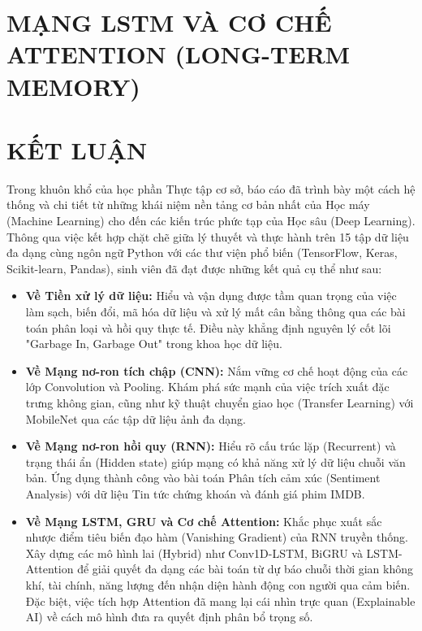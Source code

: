 \documentclass[12pt, a4paper]{article}
\begin{document}
\section{MẠNG LSTM VÀ CƠ CHẾ ATTENTION (LONG-TERM MEMORY)}

\newpage

\section*{KẾT LUẬN}
Trong khuôn khổ của học phần Thực tập cơ sở, báo cáo đã trình bày một cách hệ thống và chi tiết từ những khái niệm nền tảng cơ bản nhất của Học máy (Machine Learning) cho đến các kiến trúc phức tạp của Học sâu (Deep Learning). Thông qua việc kết hợp chặt chẽ giữa lý thuyết và thực hành trên 15 tập dữ liệu đa dạng cùng ngôn ngữ Python với các thư viện phổ biến (TensorFlow, Keras, Scikit-learn, Pandas), sinh viên đã đạt được những kết quả cụ thể như sau:

\begin{itemize}
    \item \textbf{Về Tiền xử lý dữ liệu:} Hiểu và vận dụng được tầm quan trọng của việc làm sạch, biến đổi, mã hóa dữ liệu và xử lý mất cân bằng thông qua các bài toán phân loại và hồi quy thực tế. Điều này khẳng định nguyên lý cốt lõi "Garbage In, Garbage Out" trong khoa học dữ liệu.
    \item \textbf{Về Mạng nơ-ron tích chập (CNN):} Nắm vững cơ chế hoạt động của các lớp Convolution và Pooling. Khám phá sức mạnh của việc trích xuất đặc trưng không gian, cũng như kỹ thuật chuyển giao học (Transfer Learning) với MobileNet qua các tập dữ liệu ảnh đa dạng.
    \item \textbf{Về Mạng nơ-ron hồi quy (RNN):} Hiểu rõ cấu trúc lặp (Recurrent) và trạng thái ẩn (Hidden state) giúp mạng có khả năng xử lý dữ liệu chuỗi văn bản. Ứng dụng thành công vào bài toán Phân tích cảm xúc (Sentiment Analysis) với dữ liệu Tin tức chứng khoán và đánh giá phim IMDB.
    \item \textbf{Về Mạng LSTM, GRU và Cơ chế Attention:} Khắc phục xuất sắc nhược điểm tiêu biến đạo hàm (Vanishing Gradient) của RNN truyền thống. Xây dựng các mô hình lai (Hybrid) như Conv1D-LSTM, BiGRU và LSTM-Attention để giải quyết đa dạng các bài toán từ dự báo chuỗi thời gian không khí, tài chính, năng lượng đến nhận diện hành động con người qua cảm biến. Đặc biệt, việc tích hợp Attention đã mang lại cái nhìn trực quan (Explainable AI) về cách mô hình đưa ra quyết định phân bổ trọng số.
\end{itemize}
\end{document}
